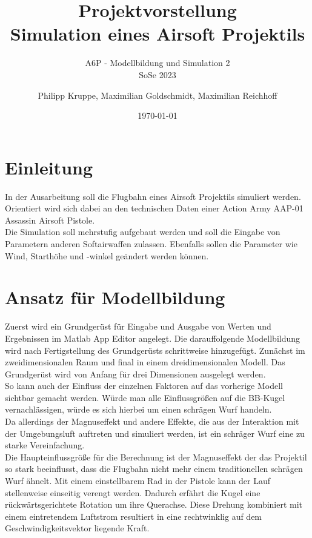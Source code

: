\documentclass{scrartcl}
\title{Projektvorstellung \\[0.2em]\smaller{} Simulation eines Airsoft Projektils}
\subtitle{A6P - Modellbildung und Simulation 2 \\ SoSe 2023}
\author{Philipp Kruppe, Maximilian Goldschmidt, Maximilian Reichhoff}
\date{\today}
\begin{document}
\maketitle

\vspace{20mm}


\tableofcontents

\newpage


\section{Einleitung}

In der Ausarbeitung soll die Flugbahn eines Airsoft Projektils simuliert werden. 
Orientiert wird sich dabei an den technischen Daten einer Action Army AAP-01 Assassin Airsoft Pistole. \\
Die Simulation soll mehrstufig aufgebaut werden und soll die Eingabe von Parametern anderen Softairwaffen zulassen. 
Ebenfalls sollen die Parameter wie Wind, Starthöhe und -winkel geändert werden können.

\section{Ansatz für Modellbildung}

Zuerst wird ein Grundgerüst für Eingabe und Ausgabe von Werten und Ergebnissen im Matlab App Editor angelegt.
Die darauffolgende Modellbildung wird nach Fertigstellung des Grundgerüsts schrittweise hinzugefügt.
Zunächst im zweidimensionalen Raum und final in einem dreidimensionalen Modell.
Das Grundgerüst wird von Anfang für drei Dimensionen ausgelegt werden.\\
So kann auch der Einfluss der einzelnen Faktoren auf das vorherige Modell sichtbar gemacht werden.
Würde man alle Einflussgrößen auf die BB-Kugel vernachlässigen, würde es sich hierbei um einen schrägen Wurf handeln. \\
Da allerdings der Magnuseffekt und andere Effekte, die aus der Interaktion mit der Umgebungsluft auftreten und simuliert werden, ist ein schräger Wurf eine zu starke Vereinfachung. \\
Die Haupteinflussgröße für die Berechnung ist der Magnuseffekt der das Projektil so stark beeinflusst, dass die Flugbahn nicht mehr einem traditionellen schrägen Wurf ähnelt.
Mit einem einstellbarem Rad in der Pistole kann der Lauf stellenweise einseitig verengt werden. 
Dadurch erfährt die Kugel eine rückwärtsgerichtete Rotation um ihre Querachse. 
Diese Drehung kombiniert mit einem eintretendem Luftstrom resultiert in eine rechtwinklig auf dem Geschwindigkeitsvektor liegende Kraft.
\end{document}
